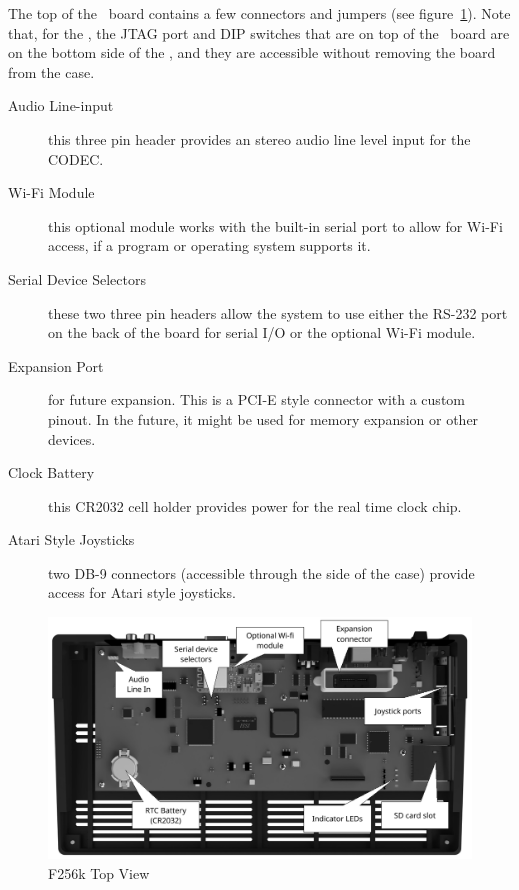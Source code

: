 The top of the \fk\ board contains a few connectors and jumpers (see figure~\ref{fig:top_k}). Note that, for the \fk, the JTAG port and DIP switches that are on top of the \fjr\ board are on the bottom side of the \fk, and they are accessible without removing the board from the case.

\begin{description}
    \item[Audio Line-input] this three pin header provides an stereo audio line level input for the CODEC.
    
    \item[Wi-Fi Module] this optional module works with the built-in serial port to allow for Wi-Fi access, if a program or operating system supports it.

    \item[Serial Device Selectors] these two three pin headers allow the system to use either the RS-232 port on the back of the board for serial I/O or the optional Wi-Fi module.

    \item[Expansion Port] for future expansion. This is a PCI-E style connector with a custom pinout. In the future, it might be used for memory expansion or other devices.

    \item[Clock Battery] this CR2032 cell holder provides power for the real time clock chip.
    
    \item[Atari Style Joysticks] two DB-9 connectors (accessible through the side of the case) provide access for Atari style joysticks.
   \end{description}

\begin{figure}[ht]
    \begin{center}
        \includegraphics[scale=0.55]{images/f256k_top_annotated.pdf}
    \end{center}
    \caption{F256k Top View}
    \label{fig:top_k}
\end{figure}

